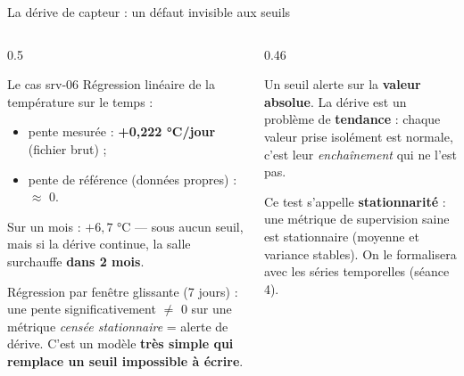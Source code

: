 \begin{frame}{La dérive de capteur : un défaut invisible aux seuils}
\footnotesize%
\begin{columns}[t]
\begin{column}{0.5\textwidth}
\begin{block}{Le cas srv-06}
Régression linéaire de la température sur le temps :
\begin{itemize}
\item pente mesurée : \textbf{+0,222 °C/jour} (fichier brut) ;
\item pente de référence (données propres) : $\approx$ 0.
\end{itemize}
Sur un mois : $+6{,}7$ °C --- sous aucun seuil, mais si la dérive
continue, la salle surchauffe \textbf{dans 2 mois}.
\end{block}
\begin{ebox}
Régression par fenêtre glissante (7 jours) : une pente
significativement $\ne$ 0 sur une métrique \emph{censée stationnaire}
= alerte de dérive. C'est un modèle \textbf{très simple qui remplace
un seuil impossible à écrire}.
\end{ebox}
\end{column}
\begin{column}{0.46\textwidth}
\begin{wbox}
Un seuil alerte sur la \textbf{valeur absolue}. La dérive est un
problème de \textbf{tendance} : chaque valeur prise isolément est
normale, c'est leur \emph{enchaînement} qui ne l'est pas.
\end{wbox}
\begin{kbox}[Vocabulaire]
Ce test s'appelle \textbf{stationnarité} : une métrique de supervision
saine est stationnaire (moyenne et variance stables). On le formalisera
avec les séries temporelles (séance 4).
\end{kbox}
\end{column}
\end{columns}
\end{frame}

